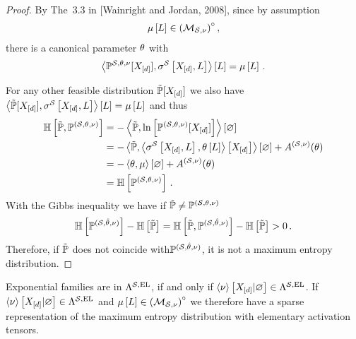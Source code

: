 \documentclass[aps,onecolumn,nofootinbib,pra]{article}
\begin{document}
    \begin{proof}
        By The~3.3 in [Wainright and Jordan, 2008], since by assumption
        \begin{align*}
            \mu\left[L\right] \in {\left(\mathcal{M}_{\mathcal{S},\nu}\right)}^{\circ}  \, ,
        \end{align*}
        there is a canonical parameter $\theta$ with
        \begin{align*}
            \left\langle \mathbb{P}^{\mathcal{S},\theta,\nu}[X_{[d]}],\sigma^{\mathcal{S}}\left[X_{[d]},L\right]\right\rangle \left[ L \right]=\mu\left[L\right] \, .
        \end{align*}

        For any other feasible distribution $\tilde{\mathbb{P}}[X_{[d]}]$ we also have $\left\langle \tilde{\mathbb{P}}[X_{[d]}],\sigma^{\mathcal{S}}\left[X_{[d]},L\right]\right\rangle \left[ L \right]=\mu\left[L\right]$ and thus
        \begin{align*}
            \mathbb{H}\left[\tilde{\mathbb{P}},\mathbb{P}^{(\mathcal{S},\theta,\nu)}\right]
            &= -\left\langle \tilde{\mathbb{P}},\ln \left[ \mathbb{P}^{(\mathcal{S},\theta,\nu)}[X_{[d]}] \right]\right\rangle \left[ \varnothing \right] \\
            &= -\left\langle \tilde{\mathbb{P}},\left\langle \sigma^{\mathcal{S}}\left[X_{[d]},L\right],\theta\left[L\right]\right\rangle \left[ X_{[d]} \right]\right\rangle \left[ \varnothing \right] + A^{(\mathcal{S},\nu)}(\theta) \\
            &= - \left\langle \theta,\mu\right\rangle \left[ \varnothing \right] + A^{(\mathcal{S},\nu)}(\theta) \\
            &= \mathbb{H}\left[\mathbb{P}^{(\mathcal{S},\theta,\nu)}\right] \, .
        \end{align*}
        With the Gibbs inequality we have if $\tilde{\mathbb{P}}\neq\mathbb{P}^{(\mathcal{S},\theta,\nu)}$
        \begin{align*}
            \mathbb{H}\left[\mathbb{P}^{(\mathcal{S},\hat{\theta},\nu)}\right] - \mathbb{H}\left[\tilde{\mathbb{P}}\right]
            = \mathbb{H}\left[\tilde{\mathbb{P}},\mathbb{P}^{(\mathcal{S},\hat{\theta},\nu)}\right] - \mathbb{H}\left[\tilde{\mathbb{P}}\right] > 0 \, .
        \end{align*}
        Therefore, if $\tilde{\mathbb{P}}$ does not coincide with$\mathbb{P}^{(\mathcal{S},\hat{\theta},\nu)}$, it is not a maximum entropy distribution.
    \end{proof}

    Exponential families are in $\Lambda^{\mathcal{S},\mathrm{EL}}$, if and only if $\left\langle \nu\right\rangle \left[ X_{[d]} | \varnothing \right]\in\Lambda^{\mathcal{S},\mathrm{EL}}$.
    If $\left\langle \nu\right\rangle \left[ X_{[d]} | \varnothing \right]\in\Lambda^{\mathcal{S},\mathrm{EL}}$ and $\mu\left[L\right] \in {\left(\mathcal{M}_{\mathcal{S},\nu}\right)}^{\circ} $ we therefore have a sparse representation of the maximum entropy distribution with elementary activation tensors.
\end{document}
